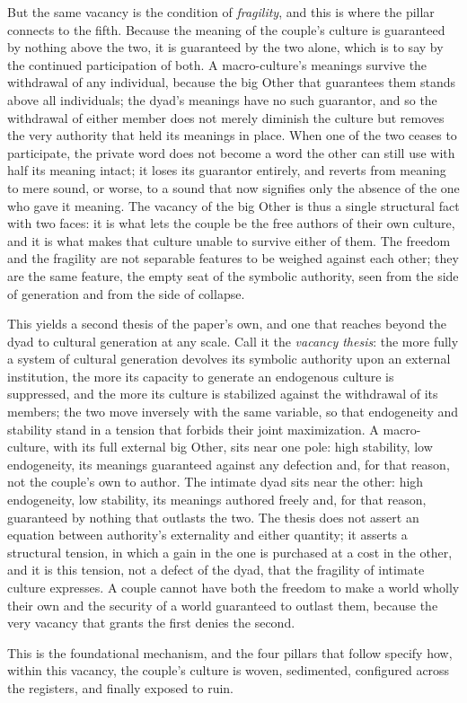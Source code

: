 But the same vacancy is the condition of \emph{fragility}, and this is where the pillar connects to the fifth. Because the meaning of the couple's culture is guaranteed by nothing above the two, it is guaranteed by the two alone, which is to say by the continued participation of both. A macro-culture's meanings survive the withdrawal of any individual, because the big Other that guarantees them stands above all individuals; the dyad's meanings have no such guarantor, and so the withdrawal of either member does not merely diminish the culture but removes the very authority that held its meanings in place. When one of the two ceases to participate, the private word does not become a word the other can still use with half its meaning intact; it loses its guarantor entirely, and reverts from meaning to mere sound, or worse, to a sound that now signifies only the absence of the one who gave it meaning. The vacancy of the big Other is thus a single structural fact with two faces: it is what lets the couple be the free authors of their own culture, and it is what makes that culture unable to survive either of them. The freedom and the fragility are not separable features to be weighed against each other; they are the same feature, the empty seat of the symbolic authority, seen from the side of generation and from the side of collapse.

This yields a second thesis of the paper's own, and one that reaches beyond the dyad to cultural generation at any scale. Call it the \emph{vacancy thesis}: the more fully a system of cultural generation devolves its symbolic authority upon an external institution, the more its capacity to generate an endogenous culture is suppressed, and the more its culture is stabilized against the withdrawal of its members; the two move inversely with the same variable, so that endogeneity and stability stand in a tension that forbids their joint maximization. A macro-culture, with its full external big Other, sits near one pole: high stability, low endogeneity, its meanings guaranteed against any defection and, for that reason, not the couple's own to author. The intimate dyad sits near the other: high endogeneity, low stability, its meanings authored freely and, for that reason, guaranteed by nothing that outlasts the two. The thesis does not assert an equation between authority's externality and either quantity; it asserts a structural tension, in which a gain in the one is purchased at a cost in the other, and it is this tension, not a defect of the dyad, that the fragility of intimate culture expresses. A couple cannot have both the freedom to make a world wholly their own and the security of a world guaranteed to outlast them, because the very vacancy that grants the first denies the second.

This is the foundational mechanism, and the four pillars that follow specify how, within this vacancy, the couple's culture is woven, sedimented, configured across the registers, and finally exposed to ruin.
